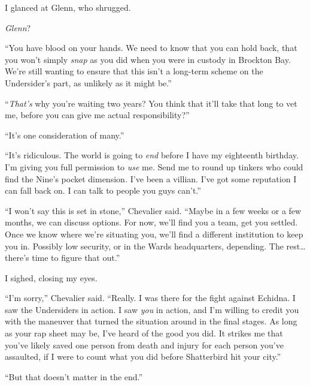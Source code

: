 I glanced at Glenn, who shrugged.



\emph{Glenn}?



``You have blood on your hands.  We need to know that you can hold back, that you won't simply \emph{snap} as you did when you were in custody in Brockton Bay.  We're still wanting to ensure that this isn't a long-term scheme on the Undersider's part, as unlikely as it might be.''



``\emph{That's} why you're waiting two years?  You think that it'll take that long to vet me, before you can give me actual responsibility?''



``It's one consideration of many.''



``It's ridiculous.  The world is going to \emph{end} before I have my eighteenth birthday.  I'm giving you full permission to \emph{use} me.  Send me to round up tinkers who could find the Nine's pocket dimension\emph{. } I've been a villian.  I've got some reputation I can fall back on.  I can talk to people you guys can't.''



``I won't say this is set in stone,'' Chevalier said.  ``Maybe in a few weeks or a few months, we can discuss options.  For now, we'll find you a team, get you settled.  Once we know where we're situating you, we'll find a different institution to keep you in.  Possibly low security, or in the Wards headquarters, depending.  The rest\ldots there's time to figure that out.''



I sighed, closing my eyes.



``I'm sorry,'' Chevalier said.  ``Really.  I was there for the fight against Echidna.  I saw the Undersiders in action.  I saw \emph{you} in action, and I'm willing to credit you with the maneuver that turned the situation around in the final stages.  As long as your rap sheet may be, I've heard of the good you did.  It strikes me that you've likely saved one person from death and injury for each person you've assaulted, if I were to count what you did before Shatterbird hit your city.''



``But that doesn't matter in the end.''



